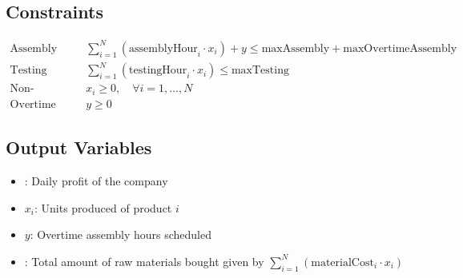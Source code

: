 \documentclass{article}
\begin{document}
\subsection*{Constraints}
\begin{align}
    \text{Assembly Labor Constraint:} \quad & \sum_{i=1}^{N} (\text{assemblyHour}_i \cdot x_i) + y \leq \text{maxAssembly} + \text{maxOvertimeAssembly} \\
    \text{Testing Labor Constraint:} \quad & \sum_{i=1}^{N} (\text{testingHour}_i \cdot x_i) \leq \text{maxTesting} \\
    \text{Non-negativity Constraint:} \quad & x_i \geq 0, \quad \forall i = 1, \ldots, N \\
    \text{Overtime Non-negativity Constraint:} \quad & y \geq 0
\end{align}

\subsection*{Output Variables}
\begin{itemize}
    \item {}: Daily profit of the company
    \item \( x_i \): Units produced of product \( i \)
    \item \( y \): Overtime assembly hours scheduled
    \item {}: Total amount of raw materials bought given by \( \sum_{i=1}^{N} (\text{materialCost}_i \cdot x_i) \)
\end{itemize}
\end{document}
